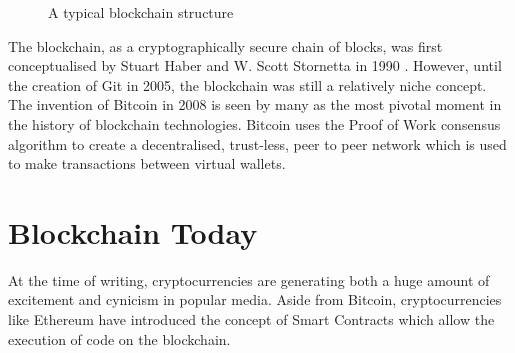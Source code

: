\documentclass[12pt,a4paper,twoside,openright]{report}
\begin{document}
	\begin{figure}
		\begin{center}
			\end{center}
		\caption{A typical blockchain structure}
		\label{fig:mainblockchain}
	\end{figure}
	The blockchain, as a cryptographically secure chain of blocks, was first conceptualised by Stuart Haber and W. Scott Stornetta in 1990 \cite{HaberStornetta}.
	However, until the creation of Git \cite{Git} in 2005, the blockchain was still a relatively niche concept.
	The invention of Bitcoin in 2008 is seen by many as the most pivotal moment in the history of blockchain technologies.
	Bitcoin uses the Proof of Work consensus algorithm to create a decentralised, trust-less, peer to peer network which is used to make transactions between virtual wallets.

	\section{Blockchain Today}
	At the time of writing, cryptocurrencies are generating both a huge amount of excitement and cynicism in popular media. 
	Aside from Bitcoin, cryptocurrencies like Ethereum \cite{Ethereum} have introduced the concept of Smart Contracts which allow the execution of code on the blockchain.\\
	
\end{document}
